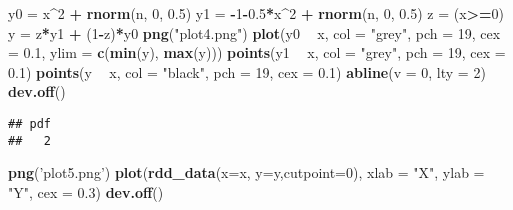 \documentclass[]{article}
\newenvironment{Shaded}{\begin{snugshade}}{\end{snugshade}}
\newcommand{\KeywordTok}[1]{\textcolor[rgb]{0.13,0.29,0.53}{\textbf{#1}}}
\newcommand{\DataTypeTok}[1]{\textcolor[rgb]{0.13,0.29,0.53}{#1}}
\newcommand{\DecValTok}[1]{\textcolor[rgb]{0.00,0.00,0.81}{#1}}
\newcommand{\FloatTok}[1]{\textcolor[rgb]{0.00,0.00,0.81}{#1}}
\newcommand{\StringTok}[1]{\textcolor[rgb]{0.31,0.60,0.02}{#1}}
\newcommand{\OperatorTok}[1]{\textcolor[rgb]{0.81,0.36,0.00}{\textbf{#1}}}
\newcommand{\NormalTok}[1]{#1}
\begin{document}
\begin{Shaded}
\begin{Highlighting}[]
\NormalTok{y0  =}\StringTok{ }\NormalTok{x}\OperatorTok{^}\DecValTok{2} \OperatorTok{+}\StringTok{ }\KeywordTok{rnorm}\NormalTok{(n, }\DecValTok{0}\NormalTok{, }\FloatTok{0.5}\NormalTok{)}
\NormalTok{y1  =}\StringTok{ }\OperatorTok{-}\DecValTok{1}\OperatorTok{-}\FloatTok{0.5}\OperatorTok{*}\NormalTok{x}\OperatorTok{^}\DecValTok{2} \OperatorTok{+}\StringTok{ }\KeywordTok{rnorm}\NormalTok{(n, }\DecValTok{0}\NormalTok{, }\FloatTok{0.5}\NormalTok{)}
\NormalTok{z   =}\StringTok{ }\NormalTok{(x}\OperatorTok{>=}\DecValTok{0}\NormalTok{)}
\NormalTok{y   =}\StringTok{ }\NormalTok{z}\OperatorTok{*}\NormalTok{y1 }\OperatorTok{+}\StringTok{ }\NormalTok{(}\DecValTok{1}\OperatorTok{-}\NormalTok{z)}\OperatorTok{*}\NormalTok{y0}
\KeywordTok{png}\NormalTok{(}\StringTok{"plot4.png"}\NormalTok{)}
\KeywordTok{plot}\NormalTok{(y0 }\OperatorTok{~}\StringTok{ }\NormalTok{x, }\DataTypeTok{col =} \StringTok{"grey"}\NormalTok{, }\DataTypeTok{pch =} \DecValTok{19}\NormalTok{, }\DataTypeTok{cex =} \FloatTok{0.1}\NormalTok{,}
     \DataTypeTok{ylim =} \KeywordTok{c}\NormalTok{(}\KeywordTok{min}\NormalTok{(y), }\KeywordTok{max}\NormalTok{(y)))}
\KeywordTok{points}\NormalTok{(y1 }\OperatorTok{~}\StringTok{ }\NormalTok{x, }\DataTypeTok{col =} \StringTok{"grey"}\NormalTok{, }\DataTypeTok{pch =} \DecValTok{19}\NormalTok{, }\DataTypeTok{cex =} \FloatTok{0.1}\NormalTok{)}
\KeywordTok{points}\NormalTok{(y }\OperatorTok{~}\StringTok{ }\NormalTok{x, }\DataTypeTok{col =} \StringTok{"black"}\NormalTok{, }\DataTypeTok{pch =} \DecValTok{19}\NormalTok{, }\DataTypeTok{cex =} \FloatTok{0.1}\NormalTok{)}
\KeywordTok{abline}\NormalTok{(}\DataTypeTok{v =} \DecValTok{0}\NormalTok{, }\DataTypeTok{lty =} \DecValTok{2}\NormalTok{)}
\KeywordTok{dev.off}\NormalTok{()}
\end{Highlighting}
\end{Shaded}

\begin{verbatim}
## pdf 
##   2
\end{verbatim}

\begin{Shaded}
\begin{Highlighting}[]
\KeywordTok{png}\NormalTok{(}\StringTok{'plot5.png'}\NormalTok{)}
\KeywordTok{plot}\NormalTok{(}\KeywordTok{rdd_data}\NormalTok{(}\DataTypeTok{x=}\NormalTok{x, }\DataTypeTok{y=}\NormalTok{y,}\DataTypeTok{cutpoint=}\DecValTok{0}\NormalTok{), }
     \DataTypeTok{xlab =} \StringTok{"X"}\NormalTok{, }\DataTypeTok{ylab =} \StringTok{"Y"}\NormalTok{, }\DataTypeTok{cex =} \FloatTok{0.3}\NormalTok{)}
\KeywordTok{dev.off}\NormalTok{()}
\end{Highlighting}
\end{Shaded}
\end{document}
